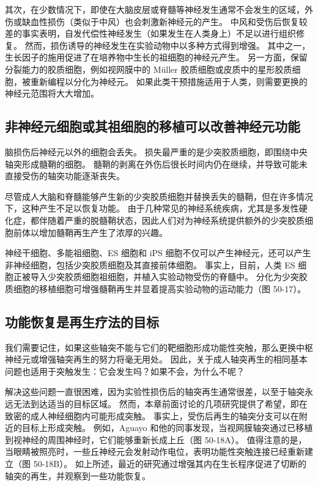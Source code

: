 其次，在少数情况下，即使在大脑皮层或脊髓等神经发生通常不会发生的区域，外伤或缺血性损伤（类似于中风）也会刺激新神经元的产生。 中风和受伤后恢复较差的事实表明，自发代偿性神经发生（如果发生在人类身上）不足以进行组织修复。 然而，损伤诱导的神经发生在实验动物中以多种方式得到增强。 其中之一，生长因子的施用促进了在培养物中生长的祖细胞的神经元产生。 另一方面，保留分裂能力的胶质细胞，例如视网膜中的 Müller 胶质细胞或皮质中的星形胶质细胞，被重新编程以分化为神经元。 如果此类干预措施适用于人类，则需要更换的神经元范围将大大增加。

\subsection{非神经元细胞或其祖细胞的移植可以改善神经元功能}
脑损伤后神经元以外的细胞会丢失。 损失最严重的是少突胶质细胞，即围绕中央轴突形成髓鞘的细胞。 髓鞘的剥离在外伤后很长时间内仍在继续，并导致可能未直接受伤的轴突功能逐渐丧失。

尽管成人大脑和脊髓能够产生新的少突胶质细胞并替换丢失的髓鞘，但在许多情况下，这种产生不足以恢复功能。 由于几种常见的神经系统疾病，尤其是多发性硬化症，都伴随着严重的脱髓鞘状态，因此人们对为神经系统提供额外的少突胶质细胞前体以增加髓鞘再生产生了浓厚的兴趣。

神经干细胞、多能祖细胞、ES 细胞和 iPS 细胞不仅可以产生神经元，还可以产生非神经细胞，包括少突胶质细胞及其直接前体细胞。 事实上，目前，人类 ES 细胞正被导入少突胶质细胞祖细胞，并植入实验动物受伤的脊髓中。 分化为少突胶质细胞的移植细胞可增强髓鞘再生并显着提高实验动物的运动能力（图 50-17）。

\subsection{功能恢复是再生疗法的目标}
我们需要记住，如果这些轴突不能与它们的靶细胞形成功能性突触，那么更换中枢神经元或增强轴突再生的努力将毫无用处。 因此，关于成人轴突再生的相同基本问题也适用于突触发生：它会发生吗？如果不会，为什么不呢？

解决这些问题一直很困难，因为实验性损伤后的轴突再生通常很差，以至于轴突永远无法到达适当的目标区域。 然而，本章前面讨论的几项研究提供了希望，即在致密的成人神经细胞内可能形成突触。 事实上，受伤后再生的轴突分支可以在附近的目标上形成突触。 例如，Aguayo 和他的同事发现，当视网膜轴突通过已移植到视神经的周围神经时，它们能够重新长成上丘（图 50-18A）。 值得注意的是，当眼睛被照亮时，一些丘神经元会发射动作电位，表明功能性突触连接已经重新建立（图 50-18B）。 如上所述，最近的研究通过增强其内在生长程序促进了切断的轴突的再生，并观察到一些功能恢复。

